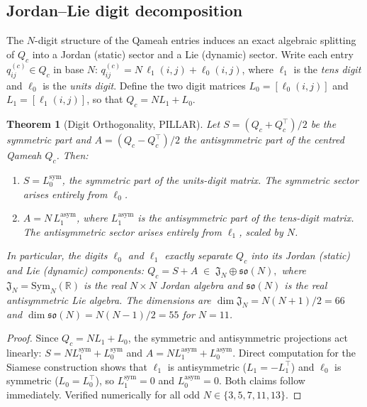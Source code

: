 \documentclass[aps,prd,twocolumn,superscriptaddress,floatfix,nofootinbib]{revtex4-2}
\newtheorem{theorem}{Theorem}
\theoremstyle{definition}
\theoremstyle{remark}
\begin{document}
\subsection{Jordan--Lie digit decomposition}
\label{sec:jordan-lie-digits}

The $N$-digit structure of the Qameah entries induces an exact algebraic
splitting of $Q_c$ into a Jordan (static) sector and a Lie (dynamic)
sector.  Write each entry $q_{ij}^{(c)} \in Q_c$ in base $N$:
$q_{ij}^{(c)} = N\,\ell_1(i,j) + \ell_0(i,j)$,
where $\ell_1$ is the \emph{tens digit} and $\ell_0$ is the
\emph{units digit}.  Define the two digit matrices
$L_0 = [\ell_0(i,j)]$ and $L_1 = [\ell_1(i,j)]$, so that
$Q_c = N L_1 + L_0$.

\begin{theorem}[Digit Orthogonality, PILLAR]
\label{thm:digit-orthogonality}
Let $S = (Q_c + Q_c^\top)/2$ be the symmetric part and
$A = (Q_c - Q_c^\top)/2$ the antisymmetric part of the centred
Qameah $Q_c$.  Then:
\begin{enumerate}
  \item[(i)]  $S = L_0^{\mathrm{sym}}$, the symmetric part of the
    units-digit matrix.  The symmetric sector arises \emph{entirely}
    from $\ell_0$.
  \item[(ii)] $A = N\,L_1^{\mathrm{asym}}$, where $L_1^{\mathrm{asym}}$
    is the antisymmetric part of the tens-digit matrix.  The
    antisymmetric sector arises \emph{entirely} from $\ell_1$,
    scaled by $N$.
\end{enumerate}
In particular, the digits $\ell_0$ and $\ell_1$ exactly separate
$Q_c$ into its Jordan (static) and Lie (dynamic) components:
$Q_c = S + A \;\in\; \mathfrak{J}_N \oplus \mathfrak{so}(N),$
where $\mathfrak{J}_N = \mathrm{Sym}_N(\mathbb{R})$ is the real
$N{\times}N$ Jordan algebra and $\mathfrak{so}(N)$ is the real
antisymmetric Lie algebra.
The dimensions are $\dim\mathfrak{J}_N = N(N{+}1)/2 = 66$ and
$\dim\mathfrak{so}(N) = N(N{-}1)/2 = 55$ for $N=11$.
\end{theorem}

\begin{proof}
Since $Q_c = N L_1 + L_0$, the symmetric and antisymmetric
projections act linearly:
$S = N L_1^{\mathrm{sym}} + L_0^{\mathrm{sym}}$ and
$A = N L_1^{\mathrm{asym}} + L_0^{\mathrm{asym}}$.
Direct computation for the Siamese construction shows that
$\ell_1$ is antisymmetric ($L_1 = -L_1^\top$) and $\ell_0$
is symmetric ($L_0 = L_0^\top$), so $L_1^{\mathrm{sym}} = 0$
and $L_0^{\mathrm{asym}} = 0$.  Both claims follow immediately.
Verified numerically for all odd $N \in \{3,5,7,11,13\}$.
\end{proof}
\end{document}
